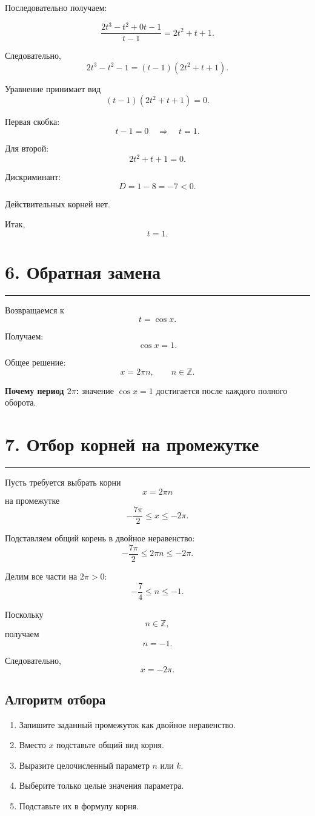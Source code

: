 \documentclass[a4paper,12pt]{article}
\newcommand{\sectionline}{%
    \vspace{0.2em}
    \noindent\color{linegray}\rule{\linewidth}{0.6pt}
    \vspace{0.4em}
}
\begin{document}
Последовательно получаем:

\[
\frac{2t^3-t^2+0t-1}{t-1}
=
2t^2+t+1.
\]

Следовательно,
\[
2t^3-t^2-1
=
(t-1)(2t^2+t+1).
\]

Уравнение принимает вид
\[
(t-1)(2t^2+t+1)=0.
\]

Первая скобка:
\[
t-1=0
\quad\Rightarrow\quad
t=1.
\]

Для второй:
\[
2t^2+t+1=0.
\]

Дискриминант:
\[
D=1-8=-7<0.
\]

Действительных корней нет.

Итак,
\[
t=1.
\]

\section*{\color{darkaccent}6. Обратная замена}
\sectionline

Возвращаемся к
\[
t=\cos x.
\]

Получаем:
\[
\cos x=1.
\]

Общее решение:
\[
x=2\pi n,
\qquad n\in\mathbb Z.
\]

\textbf{Почему период \(2\pi\):} значение \(\cos x=1\) достигается после каждого полного оборота.

\section*{\color{darkaccent}7. Отбор корней на промежутке}
\sectionline

Пусть требуется выбрать корни
\[
x=2\pi n
\]
на промежутке
\[
-\frac{7\pi}{2}\le x\le-2\pi.
\]

Подставляем общий корень в двойное неравенство:
\[
-\frac{7\pi}{2}
\le
2\pi n
\le
-2\pi.
\]

Делим все части на \(2\pi>0\):
\[
-\frac74\le n\le-1.
\]

Поскольку
\[
n\in\mathbb Z,
\]
получаем
\[
n=-1.
\]

Следовательно,
\[
x=-2\pi.
\]

\subsection*{\color{accent}Алгоритм отбора}

\begin{enumerate}
    \item Запишите заданный промежуток как двойное неравенство.
    \item Вместо \(x\) подставьте общий вид корня.
    \item Выразите целочисленный параметр \(n\) или \(k\).
    \item Выберите только целые значения параметра.
    \item Подставьте их в формулу корня.
\end{enumerate}
\end{document}
